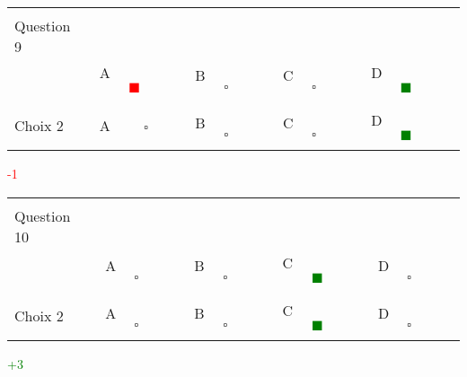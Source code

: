 \documentclass{book}%
\begin{document}
\thispagestyle{empty}%
\begin{center}%
\begin{tabular}{| l  l  l  l  l |}%
\hline%
 & & & & \\%
Question 9\qquad \qquad\ & & & & \\%
& A \textcolor{red}{$\qquad \blacksquare \qquad$}& B $\qquad \square \qquad$& C $\qquad \square \qquad$& D \textcolor{green}{$\qquad \blacksquare \qquad$}\\%
 & & & & \\%
\hline%
 & & & &  \\%
Choix 2& A $\qquad \square \qquad$& B $\qquad \square \qquad$& C $\qquad \square \qquad$& D \textcolor{green}{$\qquad \blacksquare \qquad$}\\%
 & & & &  \\%
\hline%
\end{tabular}%
 \qquad  \textcolor{red}{-1}%
\\ \vskip3mm%
\end{center}%
\thispagestyle{empty}%
\begin{center}%
\begin{tabular}{| l  l  l  l  l |}%
\hline%
 & & & & \\%
Question 10\qquad \qquad\ & & & & \\%
& A $\qquad \square \qquad$& B $\qquad \square \qquad$& C \textcolor{green}{$\qquad \blacksquare \qquad$}& D $\qquad \square \qquad$\\%
 & & & & \\%
\hline%
 & & & &  \\%
Choix 2& A $\qquad \square \qquad$& B $\qquad \square \qquad$& C \textcolor{green}{$\qquad \blacksquare \qquad$}& D $\qquad \square \qquad$\\%
 & & & &  \\%
\hline%
\end{tabular}%
 \qquad  \textcolor{green}{+3}%
\\ \vskip3mm%
\end{center}%
\end{document}
